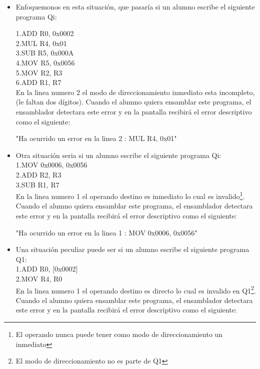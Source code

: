 \begin{itemize}

\item Enfoquemonos en esta situación, que pasaría si un alumno escribe el siguiente programa Qi:

1.ADD R0, 0x0002 \\
2.MUL R4, 0x01\\
3.SUB R5, 0x000A\\
4.MOV R5, 0x0056\\
5.MOV R2, R3\\
6.ADD R1, R7\\

En la linea numero 2 el modo de direccionamiento inmediato esta incompleto, (le faltan dos dígitos). Cuando el alumno quiera ensamblar este programa, el ensamblador detectara este error y en la pantalla recibirá el error descriptivo como el siguiente:
 
"Ha ocurrido un error en la linea 2 : MUL R4, 0x01" \\  

\item Otra situación seria si un alumno escribe el siguiente programa Qi:\\

1.MOV 0x0006, 0x0056\\
2.ADD R2, R3\\
3.SUB R1, R7\\

En la linea numero 1 el operando destino es inmediato lo cual es invalido\footnote{El operando nunca puede tener como modo de direccionamiento un inmediato}. Cuando el alumno quiera ensamblar este programa, el ensamblador detectara este error y en la pantalla recibirá el error descriptivo como el siguiente:

"Ha ocurrido un error en la linea 1 : MOV 0x0006, 0x0056" \\

\item Una situación peculiar puede ser si un alumno escribe el siguiente programa Q1:\\

1.ADD R0, [0x0002] \\
2.MOV R4, R0\\

En la linea numero 1 el operando destino es directo lo cual es invalido en Q1\footnote{El modo de direccionamiento no es parte de Q1}. Cuando el alumno quiera ensamblar este programa, el ensamblador detectara este error y en la pantalla recibirá el error descriptivo como el siguiente:


\end{itemize}
